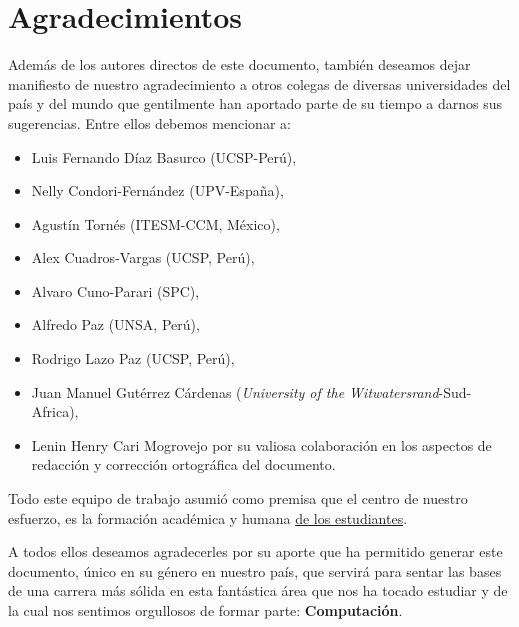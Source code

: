 \chapter*{Agradecimientos}\label{chap:cs-ack}
%

Además de los autores directos de este documento, también deseamos dejar manifiesto de nuestro 
agradecimiento a otros colegas de diversas universidades del paí­s y del mundo que gentilmente 
han aportado parte de su tiempo a darnos sus sugerencias. Entre ellos debemos mencionar a:

\begin{itemize}
\item Luis Fernando Díaz Basurco (UCSP-Perú), 
\item Nelly Condori-Fernández (UPV-España), 
\item Agustín Tornés (ITESM-CCM, México), 
\item Alex Cuadros-Vargas (UCSP, Perú),
\item Alvaro Cuno-Parari (SPC),
\item Alfredo Paz (UNSA, Perú), 
\item Rodrigo Lazo Paz (UCSP, Perú),
\item Juan Manuel Gutérrez Cárdenas (\textit{University of the Witwatersrand}-Sud-Africa),
\item Lenin Henry Cari Mogrovejo por su valiosa colaboración en los aspectos de redacción y corrección ortográfica del documento.
\end{itemize}

Todo este equipo de trabajo asumió como premisa que el centro de nuestro esfuerzo, 
es la formación académica y humana \underline{de los estudiantes}.

A todos ellos deseamos agradecerles por su aporte que ha permitido generar 
este documento, único en su género en nuestro paí­s, que servirá para sentar las 
bases de una carrera más sólida en esta fantástica área que nos ha tocado estudiar y 
de la cual nos sentimos orgullosos de formar parte: \textbf{Computación}.
